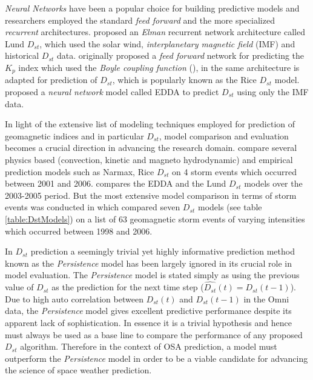 \documentclass[referee,a4paper,12pt,traditabstract]{swsc}
\begin{document}
\begin{linenumbers}
\emph{Neural Networks} have been a popular choice for building predictive models and researchers employed the standard \emph{feed forward} and the more specialized \emph{recurrent} architectures. \citet{Lund} proposed an \emph{Elman} recurrent network architecture called Lund $D_{st}$, which used the solar wind, \emph{interplanetary magnetic field} (IMF) and historical $D_{st}$ data. \citet{SWE:SWE286} originally proposed a \emph{feed forward} network for predicting the $K_p$ index which used the \emph{Boyle coupling function} (\citet{boyle1997empirical}), in \citet{SWE:SWE286} the same architecture is adapted for prediction of $D_{st}$, which is popularly known as the Rice $D_{st}$ model. \citet{pallocchia:hal-00318011} proposed a \emph{neural network} model called EDDA to predict $D_{st}$ using only the IMF data.

In light of the extensive list of modeling techniques employed for prediction of geomagnetic indices and in particular $D_{st}$, model comparison and evaluation becomes a crucial direction in advancing the research domain. \citet{Rastatter2013} compare several physics based (convection, kinetic and magneto hydrodynamic) and empirical prediction models such as Narmax, Rice $D_{st}$ on 4 storm events which occurred between 2001 and 2006. \citet{Amata2008} compares the EDDA and the Lund $D_{st}$ models over the 2003-2005 period. But the most extensive model comparison in terms of storm events was conducted in \citet{Ji2012} which compared seven $D_{st}$ models (see table \ref{table:DstModels}) on a list of 63 geomagnetic storm events of varying intensities which occurred between 1998 and 2006. 

In $D_{st}$ prediction a seemingly trivial yet highly informative prediction method known as the \emph{Persistence} model has been largely ignored in its crucial role in model evaluation. The \emph{Persistence} model is stated simply as using the previous value of $D_{st}$ as the prediction for the next time step ($\hat{D_{st}}(t) = D_{st}(t-1)$). Due to high auto correlation between $D_{st}(t)$ and $D_{st}(t-1)$ in the Omni data, the \emph{Persistence} model gives excellent predictive performance despite its apparent lack of sophistication. In essence it is a trivial hypothesis and hence must always be used as a base line to compare the performance of any proposed $D_{st}$ algorithm. Therefore in the context of OSA prediction, a model must outperform the \emph{Persistence} model in order to be a viable candidate for advancing the science of space weather prediction.


\end{linenumbers}
\end{document}
